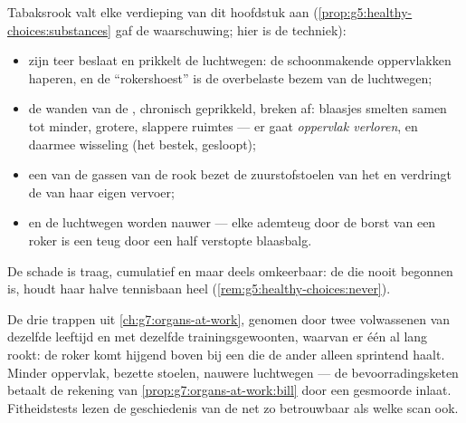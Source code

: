 \begin{proposition}\label{prop:g7:lungs-and-gas-exchange:smoke}
Tabaksrook valt elke verdieping van dit hoofdstuk aan
(\cref{prop:g5:healthy-choices:substances} gaf de waarschuwing; hier is de
techniek):
\begin{itemize}
  \item zijn teer beslaat en prikkelt de luchtwegen: de schoonmakende
        oppervlakken haperen, en de ``rokershoest'' is de overbelaste
        bezem van de luchtwegen;
  \item de wanden van de , chronisch geprikkeld, breken af:
        blaasjes smelten samen tot minder, grotere, slappere ruimtes ---
        er gaat \emph{oppervlak verloren}, en daarmee wisseling (het
        bestek, gesloopt);
  \item een van de gassen van de rook bezet de zuurstofstoelen van het
         en verdringt de  van haar eigen vervoer;
  \item en de luchtwegen worden nauwer --- elke ademteug door de borst
        van een roker is een teug door een half verstopte blaasbalg.
\end{itemize}
De schade is traag, cumulatief en maar deels omkeerbaar: de  die
nooit begonnen is, houdt haar halve tennisbaan heel
(\cref{rem:g5:healthy-choices:never}).
\end{proposition}
\admitted

\begin{example}\label{ex:g7:lungs-and-gas-exchange:stairs}
De drie trappen uit \cref{ch:g7:organs-at-work}, genomen door twee
volwassenen van dezelfde leeftijd en met dezelfde trainingsgewoonten,
waarvan er één al lang rookt: de roker komt hijgend boven bij een
 die de ander alleen sprintend haalt. Minder oppervlak, bezette
stoelen, nauwere luchtwegen --- de bevoorradingsketen betaalt de rekening
van \cref{prop:g7:organs-at-work:bill} door een gesmoorde inlaat.
Fitheidstests lezen de geschiedenis van de  net zo betrouwbaar als
welke scan ook.
\end{example}

